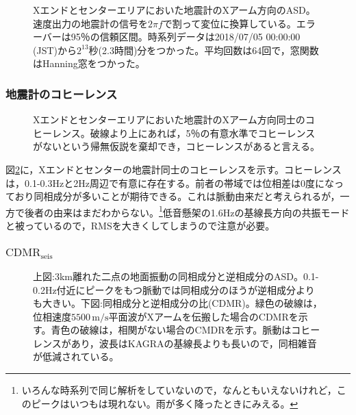 \begin{figure}[H]
  \begin{center}
  \end{center}
  \caption{Xエンドとセンターエリアにおいた地震計のXアーム方向のASD。速度出力の地震計の信号を$2\pi{f}$で割って変位に換算している。エラーバーは95％の信頼区間。時系列データは2018/07/05 00:00:00 (JST)から$2^{13}$秒(2.3時間)分をつかった。平均回数は64回で，窓関数はHanning窓をつかった。}\label{img:img1}
\end{figure}


\subsubsection{地震計のコヒーレンス}
\begin{figure}[H]
  \begin{center}
  \end{center}
  \caption{Xエンドとセンターエリアにおいた地震計のXアーム方向同士のコヒーレンス。破線より上にあれば，5％の有意水準でコヒーレンスがないという帰無仮説を棄却でき，コヒーレンスがあると言える。}\label{img:img2}
\end{figure}


図\ref{img:img2}に，Xエンドとセンターの地震計同士のコヒーレンスを示す。コヒーレンスは，0.1-0.3Hzと2Hz周辺で有意に存在する。前者の帯域では位相差は0度になっており同相成分が多いことが期待できる。これは脈動由来だと考えられるが，一方で後者の由来はまだわからない。\footnote[8]{いろんな時系列で同じ解析をしていないので，なんともいえないけれど，このピークはいつもは現れない。雨が多く降ったときにみえる。}低音懸架の1.6Hzの基線長方向の共振モードと被っているので，RMSを大きくしてしまうので注意が必要。


\subsubsection{$\mathrm{CDMR_{seis}}$}
\begin{figure}[H]
  \begin{center}
  \end{center}
  \caption{上図:3km離れた二点の地面振動の同相成分と逆相成分のASD。0.1-0.2Hz付近にピークをもつ脈動では同相成分のほうが逆相成分よりも大きい。下図:同相成分と逆相成分の比(CDMR)。緑色の破線は，位相速度$5500\, \mathrm{m/s}$平面波がXアームを伝搬した場合のCDMRを示す。青色の破線は，相関がない場合のCMDRを示す。脈動はコヒーレンスがあり，波長はKAGRAの基線長よりも長いので，同相雑音が低減されている。}\label{img:img3}
\end{figure}


